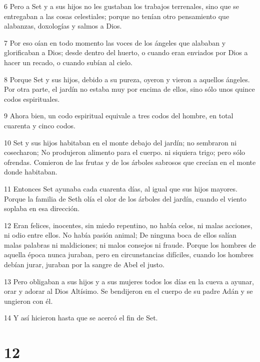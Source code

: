 \par 6 Pero a Set y a sus hijos no les gustaban los trabajos terrenales, sino que se entregaban a las cosas celestiales; porque no tenían otro pensamiento que alabanzas, doxologías y salmos a Dios.

\par 7 Por eso oían en todo momento las voces de los ángeles que alababan y glorificaban a Dios; desde dentro del huerto, o cuando eran enviados por Dios a hacer un recado, o cuando subían al cielo.

\par 8 Porque Set y sus hijos, debido a su pureza, oyeron y vieron a aquellos ángeles. Por otra parte, el jardín no estaba muy por encima de ellos, sino sólo unos quince codos espirituales.

\par 9 Ahora bien, un codo espiritual equivale a tres codos del hombre, en total cuarenta y cinco codos.

\par 10 Set y sus hijos habitaban en el monte debajo del jardín; no sembraron ni cosecharon; No produjeron alimento para el cuerpo. ni siquiera trigo; pero sólo ofrendas. Comieron de las frutas y de los árboles sabrosos que crecían en el monte donde habitaban.

\par 11 Entonces Set ayunaba cada cuarenta días, al igual que sus hijos mayores. Porque la familia de Seth olía el olor de los árboles del jardín, cuando el viento soplaba en esa dirección.

\par 12 Eran felices, inocentes, sin miedo repentino, no había celos, ni malas acciones, ni odio entre ellos. No había pasión animal; De ninguna boca de ellos salían malas palabras ni maldiciones; ni malos consejos ni fraude. Porque los hombres de aquella época nunca juraban, pero en circunstancias difíciles, cuando los hombres debían jurar, juraban por la sangre de Abel el justo.

\par 13 Pero obligaban a sus hijos y a sus mujeres todos los días en la cueva a ayunar, orar y adorar al Dios Altísimo. Se bendijeron en el cuerpo de su padre Adán y se ungieron con él.

\par 14 Y así hicieron hasta que se acercó el fin de Set.

\chapter{12}

